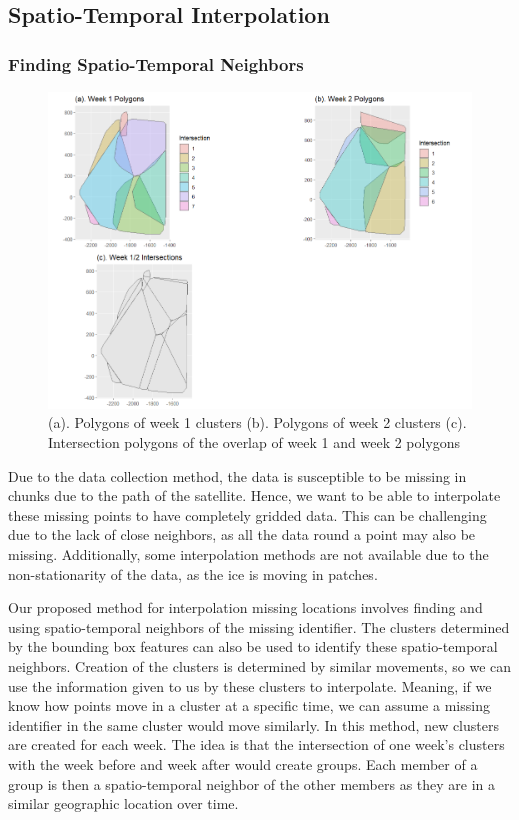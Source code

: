 \documentclass[12pt]{article}
\begin{document}
\hypertarget{spatio-temporal-interpolation}{%
\subsection{Spatio-Temporal
Interpolation}\label{spatio-temporal-interpolation}}

\hypertarget{finding-spatio-temporal-neighbors}{%
\subsubsection{Finding Spatio-Temporal
Neighbors}\label{finding-spatio-temporal-neighbors}}

\begin{figure}[tbp]

{\centering \includegraphics[width=0.8\linewidth,]{images/int-one} 

}

\caption{(a). Polygons of week 1 clusters (b). Polygons of week 2 clusters (c). Intersection polygons of the overlap of week 1 and week 2 polygons}\label{fig:int-plot}
\end{figure}

Due to the data collection method, the data is susceptible to be missing
in chunks due to the path of the satellite. Hence, we want to be able to
interpolate these missing points to have completely gridded data. This
can be challenging due to the lack of close neighbors, as all the data
round a point may also be missing. Additionally, some interpolation
methods are not available due to the non-stationarity of the data, as
the ice is moving in patches.

Our proposed method for interpolation missing locations involves finding
and using spatio-temporal neighbors of the missing identifier. The
clusters determined by the bounding box features can also be used to
identify these spatio-temporal neighbors. Creation of the clusters is
determined by similar movements, so we can use the information given to
us by these clusters to interpolate. Meaning, if we know how points move
in a cluster at a specific time, we can assume a missing identifier in
the same cluster would move similarly. In this method, new clusters are
created for each week. The idea is that the intersection of one week's
clusters with the week before and week after would create groups. Each
member of a group is then a spatio-temporal neighbor of the other
members as they are in a similar geographic location over time.
\end{document}
